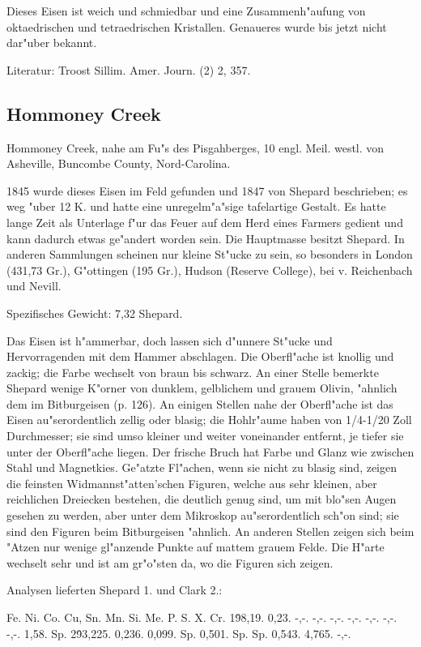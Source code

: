 \documentclass[a4paper, 11pt, oneside]{article}
\begin{document}
Dieses Eisen ist weich und schmiedbar und eine Zusammenh"aufung von oktaedrischen und tetraedrischen Kristallen. Genaueres wurde bis jetzt nicht dar"uber bekannt.

Literatur: Troost Sillim. Amer. Journ. (2) 2, 357.

\subsection{Hommoney Creek}

Hommoney Creek, nahe am Fu"s des Pisgahberges, 10 engl. Meil. westl. von Asheville, Buncombe County, Nord-Carolina.

1845 wurde dieses Eisen im Feld gefunden und 1847 von Shepard beschrieben; es weg "uber 12 K. und hatte eine unregelm"a"sige tafelartige Gestalt. Es hatte lange Zeit als Unterlage f"ur das Feuer auf dem Herd eines Farmers gedient und kann dadurch etwas ge"andert worden sein. Die Hauptmasse besitzt Shepard. In anderen Sammlungen scheinen nur kleine St"ucke zu sein, so besonders in London (431,73 Gr.), G"ottingen (195 Gr.), Hudson (Reserve College), bei v. Reichenbach und Nevill.

Spezifisches Gewicht: 7,32 Shepard.

Das Eisen ist h"ammerbar, doch lassen sich d"unnere St"ucke und Hervorragenden mit dem Hammer abschlagen. Die Oberfl"ache ist knollig und zackig; die Farbe wechselt von braun bis schwarz. An einer Stelle bemerkte Shepard wenige K"orner von dunklem, gelblichem und grauem Olivin, "ahnlich dem im Bitburgeisen (p. 126). An einigen Stellen nahe der Oberfl"ache ist das Eisen au"serordentlich zellig oder blasig; die Hohlr"aume haben von 1/4-1/20 Zoll Durchmesser; sie sind umso kleiner und weiter voneinander entfernt, je tiefer sie unter der Oberfl"ache liegen. Der frische Bruch hat Farbe und Glanz wie zwischen Stahl und Magnetkies. Ge"atzte Fl"achen, wenn sie nicht zu blasig sind, zeigen die feinsten Widmannst"atten'schen Figuren, welche aus sehr kleinen, aber reichlichen Dreiecken bestehen, die deutlich genug sind, um mit blo"sen Augen gesehen zu werden, aber unter dem Mikroskop au"serordentlich sch"on sind; sie sind den Figuren beim Bitburgeisen "ahnlich. An anderen Stellen zeigen sich beim "Atzen nur wenige gl"anzende Punkte auf mattem grauem Felde. Die H"arte wechselt sehr und ist am gr"o"sten da, wo die Figuren sich zeigen.

Analysen lieferten Shepard 1. und Clark 2.:

Fe. Ni. Co. Cu, Sn. Mn. Si. Me. P. S. X. Cr.  
1\. 98,19. 0,23. -,-. -,-. -,-. -,-. -,-. -,-. -,-. 1,58. Sp.  
2\. 93,225. 0,236. 0,099. Sp. 0,501. Sp. Sp. 0,543. 4,765. -,-.
\end{document}
